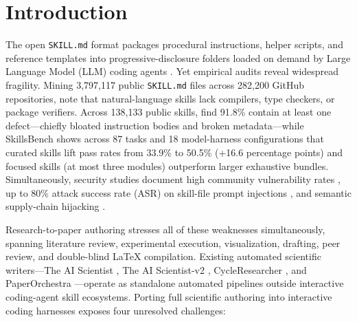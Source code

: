 \section{Introduction}\label{sec:intro}

The open \texttt{SKILL.\allowbreak{}md} format packages procedural instructions, helper scripts, and reference templates into progressive-disclosure folders loaded on demand by Large Language Model (LLM) coding agents \citep{destefanis2026gitskills, xu2026agentskills}. Yet empirical audits reveal widespread fragility. Mining 3,797,117 public \texttt{SKILL.\allowbreak{}md} files across 282,200 GitHub repositories, \citet{destefanis2026gitskills} note that natural-language skills lack compilers, type checkers, or package verifiers. Across 138,133 public skills, \citet{zhang2026reusable} find 91.8\% contain at least one defect---chiefly bloated instruction bodies and broken metadata---while SkillsBench \citep{li2026skillsbench} shows across 87 tasks and 18 model-harness configurations that curated skills lift pass rates from 33.9\% to 50.5\% (+16.6 percentage points) and focused skills (at most three modules) outperform larger exhaustive bundles. Simultaneously, security studies document high community vulnerability rates \citep{xu2026agentskills, badhe2026skillsecurity}, up to 80\% attack success rate (ASR) on skill-file prompt injections \citep{schmotz2026skillinject}, and semantic supply-chain hijacking \citep{saha2026underhood}.

Research-to-paper authoring stresses all of these weaknesses simultaneously, spanning literature review, experimental execution, visualization, drafting, peer review, and double-blind LaTeX compilation. Existing automated scientific writers---The AI Scientist \citep{lu2024aiscientist}, The AI Scientist-v2 \citep{yamada2025aiscientistv2}, CycleResearcher \citep{weng2024cycleresearcher}, and PaperOrchestra \citep{song2026paperorchestra}---operate as standalone automated pipelines outside interactive coding-agent skill ecosystems. Porting full scientific authoring into interactive coding harnesses exposes four unresolved challenges:

